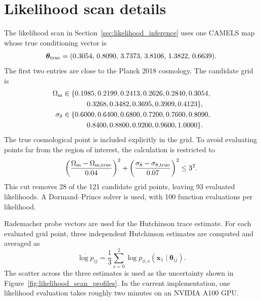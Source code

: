 \documentclass{article}
\newcommand{\Om}{\Omega_{\rm m}}
\newcommand{\sig}{\sigma_8}
\newcommand{\thetavec}{\boldsymbol{\theta}}
\begin{document}
\section{Likelihood scan details}
\label{app:likelihood_scan}

The likelihood scan in Section~\ref{sec:likelihood_inference} uses one
CAMELS map whose true conditioning vector is
\begin{equation}
  \thetavec_{\rm true}
  =
  (0.3054,\,0.8090,\,3.7373,\,3.8106,\,1.3822,\,0.6639).
  \label{eq:scan_true_params}
\end{equation}
The first two entries are close to the Planck 2018 cosmology. The
candidate grid is
\begin{align}
  \Om &\in
  \{0.1985,0.2199,0.2413,0.2626,0.2840,0.3054,\nonumber\\
      &\hspace{1.2cm}
        0.3268,0.3482,0.3695,0.3909,0.4123\},\\
  \sig &\in
  \{0.6000,0.6400,0.6800,0.7200,0.7600,0.8090,\nonumber\\
       &\hspace{1.2cm}
         0.8400,0.8800,0.9200,0.9600,1.0000\}.
\end{align}
The true cosmological point is included explicitly in the grid. To
avoid evaluating points far from the region of interest, the calculation
is restricted to
\begin{equation}
  \left(
  \frac{\Om-\Omega_{{\rm m},{\rm true}}}{0.04}
  \right)^2
  +
  \left(
  \frac{\sig-\sigma_{8,{\rm true}}}{0.07}
  \right)^2
  \leq 3^2 .
  \label{eq:scan_ellipse}
\end{equation}
This cut removes 28 of the 121 candidate grid points, leaving 93
evaluated likelihoods. A Dormand--Prince solver is used, with 100
function evaluations per likelihood.

Rademacher probe vectors are used for the Hutchinson trace estimate.
For each evaluated grid point, three independent Hutchinson estimates
are computed and averaged as
\begin{equation}
  \overline{\log p}_{ij}
  =
  \frac{1}{3}
  \sum_{s=0}^{2}
  \log p_{\phi,s}
  (\mathbf{x}_1\mid\thetavec_{ij}).
  \label{eq:hutchinson_mean}
\end{equation}
The scatter across the three estimates is used as the uncertainty shown
in Figure~\ref{fig:likelihood_scan_profiles}. In the current
implementation, one likelihood evaluation takes roughly two minutes on
an NVIDIA A100 GPU.
\end{document}
